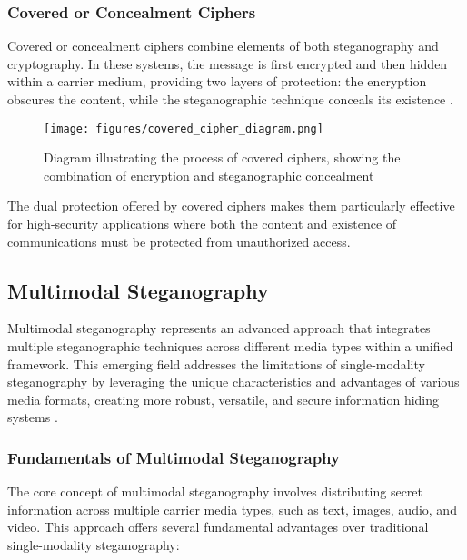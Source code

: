\documentclass[12pt, a4paper, oneside]{book}
\begin{document}
\subsubsection{Covered or Concealment Ciphers}
Covered or concealment ciphers combine elements of both steganography and cryptography. In these systems, the message is first encrypted and then hidden within a carrier medium, providing two layers of protection: the encryption obscures the content, while the steganographic technique conceals its existence \cite{Villalba2023}.

\begin{figure}[htbp]
    \centering
    \texttt{[image: figures/covered\_cipher\_diagram.png]}
    \caption{Diagram illustrating the process of covered ciphers, showing the combination of encryption and steganographic concealment}
    \label{fig:covered_cipher}
\end{figure}

The dual protection offered by covered ciphers makes them particularly effective for high-security applications where both the content and existence of communications must be protected from unauthorized access.

\subsection{Multimodal Steganography}
Multimodal steganography represents an advanced approach that integrates multiple steganographic techniques across different media types within a unified framework. This emerging field addresses the limitations of single-modality steganography by leveraging the unique characteristics and advantages of various media formats, creating more robust, versatile, and secure information hiding systems \cite{ZhangWu2023}.

\subsubsection{Fundamentals of Multimodal Steganography}
The core concept of multimodal steganography involves distributing secret information across multiple carrier media types, such as text, images, audio, and video. This approach offers several fundamental advantages over traditional single-modality steganography:
\end{document}
